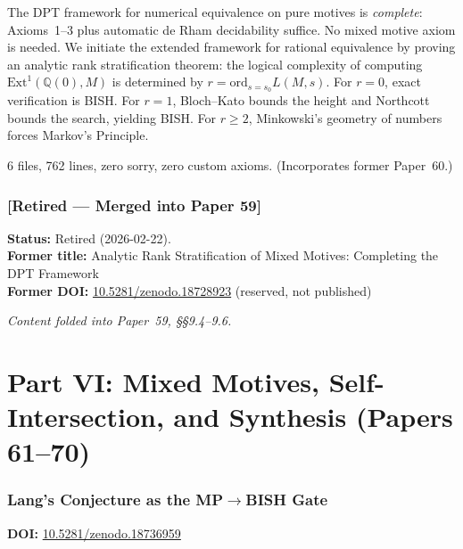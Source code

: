 \documentclass[11pt,a4paper]{article}
\begin{document}
The DPT framework for numerical equivalence on pure motives is \emph{complete}: Axioms~1--3 plus automatic de Rham decidability suffice. No mixed motive axiom is needed. We initiate the extended framework for rational equivalence by proving an analytic rank stratification theorem: the logical complexity of computing $\mathrm{Ext}^1(\mathbb{Q}(0),M)$ is determined by $r=\mathrm{ord}_{s=s_0}L(M,s)$. For $r=0$, exact verification is BISH. For $r=1$, Bloch--Kato bounds the height and Northcott bounds the search, yielding BISH. For $r\ge2$, Minkowski's geometry of numbers forces Markov's Principle.

6 files, 762 lines, zero sorry, zero custom axioms. (Incorporates former Paper~60.)

\section{[Retired --- Merged into Paper 59]}
\label{sec:p60}
\textbf{Status:} Retired (2026-02-22).\\
\textbf{Former title:} Analytic Rank Stratification of Mixed Motives: Completing the DPT Framework\\
\textbf{Former DOI:} \href{https://doi.org/10.5281/zenodo.18728923}{10.5281/zenodo.18728923} (reserved, not published)

\bigskip
\noindent\textit{Content folded into Paper~59, \S\S9.4--9.6.}

\newpage
\part*{Part VI: Mixed Motives, Self-Intersection, and Synthesis (Papers 61--70)}

\section{Lang's Conjecture as the MP$\to$BISH Gate}
\label{sec:p61}
\textbf{DOI:} \href{https://doi.org/10.5281/zenodo.18736959}{10.5281/zenodo.18736959}
\end{document}

